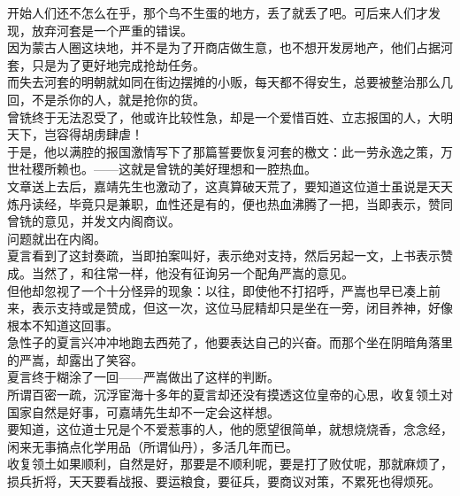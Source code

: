 \begin{multicols}{\theparacolNo}
开始人们还不怎么在乎，那个鸟不生蛋的地方，丢了就丢了吧。可后来人们才发现，放弃河套是一个严重的错误。\\

因为蒙古人圈这块地，并不是为了开商店做生意，也不想开发房地产，他们占据河套，只是为了更好地完成抢劫任务。\\

而失去河套的明朝就如同在街边摆摊的小贩，每天都不得安生，总要被整治那么几回，不是杀你的人，就是抢你的货。\\

曾铣终于无法忍受了，他或许比较性急，却是一个爱惜百姓、立志报国的人，大明天下，岂容得胡虏肆虐！\\

于是，他以满腔的报国激情写下了那篇誓要恢复河套的檄文：此一劳永逸之策，万世社稷所赖也。——这就是曾铣的美好理想和一腔热血。\\

文章送上去后，嘉靖先生也激动了，这真算破天荒了，要知道这位道士虽说是天天炼丹读经，毕竟只是兼职，血性还是有的，便也热血沸腾了一把，当即表示，赞同曾铣的意见，并发文内阁商议。\\

问题就出在内阁。\\

夏言看到了这封奏疏，当即拍案叫好，表示绝对支持，然后另起一文，上书表示赞成。当然了，和往常一样，他没有征询另一个配角严嵩的意见。\\

但他却忽视了一个十分怪异的现象：以往，即使他不打招呼，严嵩也早已凑上前来，表示支持或是赞成，但这一次，这位马屁精却只是坐在一旁，闭目养神，好像根本不知道这回事。\\

急性子的夏言兴冲冲地跑去西苑了，他要表达自己的兴奋。而那个坐在阴暗角落里的严嵩，却露出了笑容。\\

夏言终于糊涂了一回——严嵩做出了这样的判断。\\

所谓百密一疏，沉浮宦海十多年的夏言却还没有摸透这位皇帝的心思，收复领土对国家自然是好事，可嘉靖先生却不一定会这样想。\\

要知道，这位道士兄是个不爱惹事的人，他的愿望很简单，就想烧烧香，念念经，闲来无事搞点化学用品（所谓仙丹），多活几年而已。\\

收复领土如果顺利，自然是好，那要是不顺利呢，要是打了败仗呢，那就麻烦了，损兵折将，天天要看战报、要运粮食，要征兵，要商议对策，不累死也得烦死。\\


\end{multicols}
